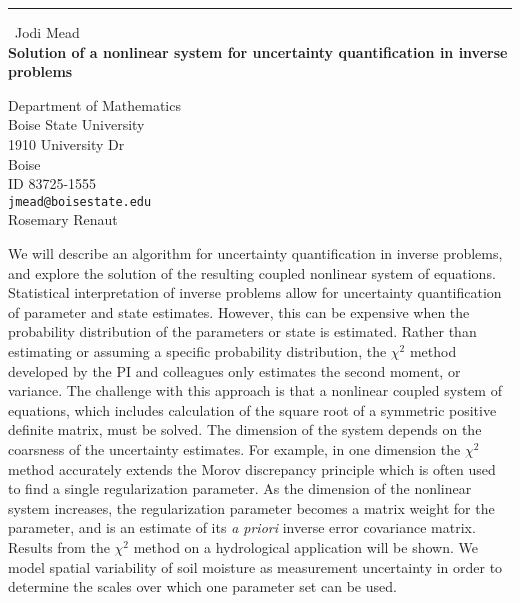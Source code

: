 \documentclass{report}
\begin{document}
\begin{center}
\rule{6in}{1pt} \
{\large Jodi Mead \\
{\bf Solution of a nonlinear system for uncertainty quantification in inverse problems}}

Department of Mathematics \\ Boise State University \\ 1910 University Dr \\ Boise \\ ID 83725-1555
\\
{\tt jmead@boisestate.edu}\\
Rosemary Renaut\end{center}

We will describe an algorithm for uncertainty quantification in inverse
problems, and explore the solution of the resulting coupled nonlinear
system of equations. Statistical interpretation of inverse problems allow
for uncertainty quantification of parameter and state estimates. However,
this can be expensive when the probability distribution of the parameters
or state is estimated. Rather than estimating or assuming a specific
probability distribution, the $\chi^2$ method developed by the PI and
colleagues only estimates the second moment, or variance. The challenge
with this approach is that a nonlinear coupled system of equations, which
includes calculation of the square root of a symmetric positive definite
matrix, must be solved. The dimension of the system depends on the
coarsness of the uncertainty estimates. For example, in one dimension the
$\chi^2$ method accurately extends the Morov discrepancy principle which
is often used to find a single regularization parameter. As the dimension
of the nonlinear system increases, the regularization parameter becomes a
matrix weight for the parameter, and is an estimate of its {\em a priori}
inverse error covariance matrix.
Results from the $\chi^2$ method on a hydrological application will be
shown. We model spatial variability of soil moisture as
measurement uncertainty in order to determine the scales over which one
parameter set can be used.
\end{document}
